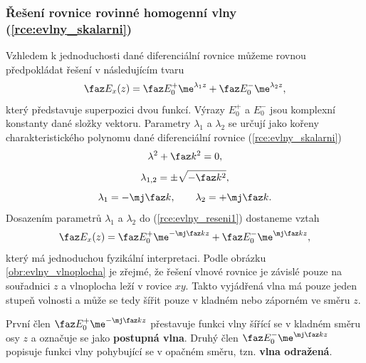 \subsubsection*{Řešení rovnice rovinné homogenní vlny (\ref{rce:evlny_skalarni})}
Vzhledem k jednoduchosti dané diferenciální rovnice můžeme rovnou předpokládat řešení v následujícím tvaru
\begin{equation}
	\faz E_{x}(z) = \faz E_{0}^{+}\me^{\lambda_{1}z} +\faz E_{0}^{-}\me^{\lambda_{2}z},
	\label{rce:evlny_reseni1}	
\end{equation}
který představuje superpozici dvou funkcí. Výrazy $E_{0}^{+}$ a $E_{0}^{-}$ jsou komplexní konstanty dané složky vektoru. Parametry $\lambda_{1}$ a $\lambda_{2}$ se určují jako kořeny charakteristického polynomu dané diferenciální rovnice (\ref{rce:evlny_skalarni})
\begin{displaymath}
	\lambda^{2} + \faz k^{2}= 0,
\end{displaymath}
\begin{displaymath}
	\lambda_{1,2} = \pm \sqrt{-\faz k^{2}},
\end{displaymath}
\begin{displaymath}
	\lambda_{1} = -\mj\faz k ,\qquad \lambda_{2} = +\mj\faz k.
\end{displaymath}
Dosazením parametrů $\lambda_{1}$ a $\lambda_{2}$ do (\ref{rce:evlny_reseni1}) dostaneme vztah 
\begin{equation}
	\faz E_{x}(z) = \faz E_{0}^{+}\me^{-\mj\faz k z} + \faz E_{0}^{-}\me^{\mj\faz k z},
	\label{rce:evlny_reseni2}	
\end{equation}
který má jednoduchou fyzikální interpretaci. Podle obrázku \ref{obr:evlny_vlnoplocha} je zřejmé, že řešení vlnové rovnice je závislé pouze na souřadnici $z$ a vlnoplocha leží v rovice $xy$. Takto vyjádřená vlna má pouze jeden stupeň volnosti a může se tedy šířit pouze v kladném nebo záporném ve směru $z$.

První člen $ \faz E_{0}^{+}\me^{-\mj\faz k z}$ přestavuje funkci vlny šířící se v kladném směru osy $z$ a označuje se jako {\bf postupná vlna}. Druhý člen $\faz E_{0}^{-}\me^{\mj\faz k z}$ popisuje funkci vlny pohybující se v opačném směru, tzn. {\bf vlna odražená}.

